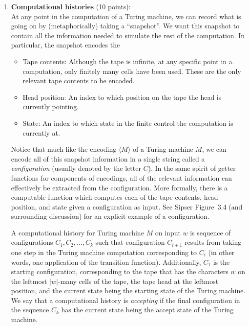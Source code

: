 \begin{enumerate}
\item \textbf{Computational histories} (10 points): \\
At any point in the computation of a Turing machine, we can 
record what is going on by (metaphorically) taking a ``snapshot''. 
We want this snapshot to contain all the information needed to simulate the rest of the computation. In particular, the snapshot encodes the
\begin{itemize}
\item Tape contents:  Although the tape is infinite, at any 
specific point in a computation, only finitely many cells have 
been used. These are the only relevant tape contents to be encoded.
\item Head position: An index to which position on the tape the head is currently pointing.
\item State: An index to which state in the finite control the computation is currently at.
\end{itemize}
Notice that much like the encoding  $\langle M \rangle$ of a 
Turing machine $M$, we can encode all of this snapshot 
information in a single string called a \emph{configuration} 
(usually denoted by the letter $C$). In the same spirit
of getter functions for components of encodings, all 
of the relevant information can effectively be extracted from 
the configuration. More formally, there is a computable 
function which computes each of the tape contents, head 
position, and state given a configuration as input. See Sipser 
Figure~3.4 (and surrounding discussion) for an explicit 
example of a configuration.

A computational history for Turing machine $M$ on input $w$ is 
sequence of configurations $C_1, C_2, \ldots, C_k$ such that 
configuration $C_{i+1}$ results from taking one step in the 
Turing machine computation corresponding to $C_i$
(in other words, one application of the transition
function). Additionally, $C_1$ is the starting configuration, 
corresponding to the tape that has the characters $w$ on 
the leftmost $|w|$-many cells of the tape, the tape head at 
the leftmost position, and the current state being the 
starting state of the Turing machine. We say that a 
computational history is {\it accepting} if the final 
configuration in the sequence $C_k$ has 
the current state being the accept state of the Turing machine.


\end{enumerate}

